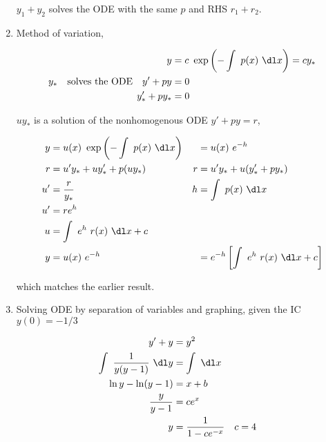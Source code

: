 \begin{enumerate}
          $ y_{1} + y_{2} $ solves the ODE with the same $ p $ and RHS $ r_{1} + r_{2} $.

    \item Method of variation,

          \begin{align}
              y               & = c\ \exp\left( -\int\ p(x)\ \dl x \right)= cy_{*} \\
              y_{*} \quad \text{solves the ODE} \quad y' + py
                              & = 0                                                \\
              y_{*}' + py_{*} & = 0
          \end{align}

          $ uy_{*} $ is a solution of the nonhomogenous ODE $ y' +py = r $,

          \begin{align}
              y  & = u(x)\ \exp\left( -\int\ p(x)\ \dl x \right)        &
                 & = u(x)\ e^{-h}                                         \\
              r  & = u'y_{*} + uy_{*}' + p(uy_{*})                      &
              r  & = u'y_{*} + u (y_{*}' + py_{*})                        \\
              u' & = \frac{r}{y_{*}}                                    &
              h  & = \int\ p(x)\ \dl x                                    \\
              u' & = re^{h}                                               \\
              u  & = \int\ e^{h}\ r(x)\ \dl x + c                         \\
              y  & = u(x)\ e^{-h}                                       &
                 & = e^{-h} \left[ \int\ e^{h}\ r(x)\ \dl x + c \right]
          \end{align}

          which matches the earlier result.

    \item Solving ODE by separation of variables and graphing, given the IC $ y(0) = -1/3 $

          \begin{align}
              y' + y                          & = y^{2}                          \\
              \int\ \frac{1}{y(y - 1)}\ \dl y & =  \int\ \dl x                   \\
              \ln y - \ln (y-1)               & = x + b                          \\
              \frac{y}{y-1}                   & = ce^{x}                         \\
              y                               & = \frac{1}{1 - ce^{-x}} & c & =4
          \end{align}


\end{enumerate}
